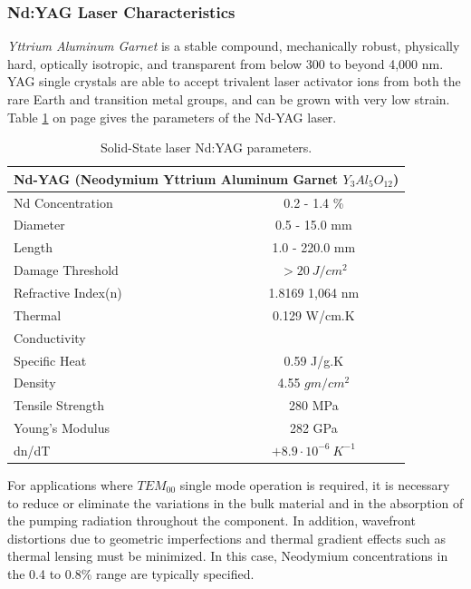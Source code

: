 \subsubsection{Nd:YAG Laser Characteristics}
\label{nd_yag}
\textit{Yttrium Aluminum Garnet} is a stable compound, mechanically robust, physically hard, optically isotropic, and transparent from below 300 to beyond 4,000 nm. YAG single crystals are able to accept trivalent laser activator ions from both the rare Earth and transition metal groups, and can be grown with very low strain. Table \ref{tab:ndyag_parameters} on page \pageref{tab:ndyag_parameters} gives the parameters of the Nd-YAG laser.

\begin{table}[ht!]
\centering
\begin{tabular}{|l|c|}
\hline
  \multicolumn{2}{|c|}{Nd-YAG (Neodymium Yttrium Aluminum Garnet $Y_3Al_5O_{12}$)}\\\hline
  Nd Concentration & 0.2 - 1.4 \% \\
  Diameter & 0.5 - 15.0 mm \\
  Length & 1.0 - 220.0 mm \\
  Damage Threshold & $> 20\ J/cm^2$  \\
  Refractive Index(n) & 1.8169 \@ 1,064 nm \\
  Thermal & 0.129 W/cm.K \\
  Conductivity & \\
  Specific Heat & 0.59 J/g.K\\
  Density & 4.55 $gm/cm^2$\\
  Tensile Strength & 280 MPa \\
  Young's Modulus & 282 GPa\\
  dn/dT & $+8.9\cdot10^{-6}\ K^{-1}$\\\hline
\end{tabular}
\caption{Solid-State laser Nd:YAG parameters.}
\label{tab:ndyag_parameters}
\end{table}

For applications where $TEM_{00}$ single mode operation is required, it is necessary to reduce or eliminate the variations in the bulk material and in the absorption of the pumping radiation throughout the component. In addition, wavefront distortions due to geometric imperfections and thermal gradient effects such as thermal lensing must be minimized. In this case, Neodymium concentrations in the 0.4 to 0.8\% range are typically specified.

